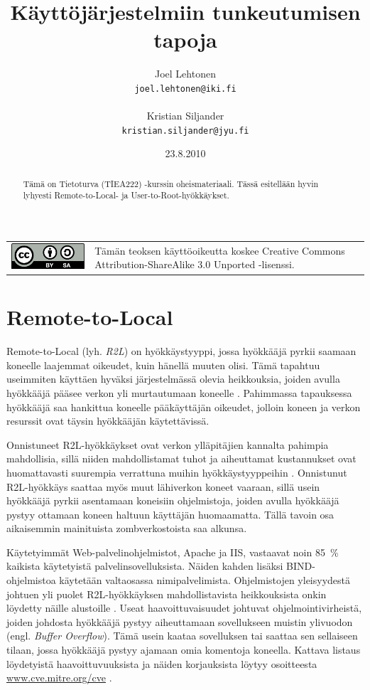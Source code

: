 \documentclass[a4paper,12pt]{article}
\title{Käyttöjärjestelmiin tunkeutumisen tapoja}
\author{Joel Lehtonen\\ \texttt{joel.lehtonen@iki.fi} \\\\Kristian Siljander\\ \texttt{kristian.siljander@jyu.fi}}
\date{23.8.2010}
\newcommand{\license}{
\bigskip%
\noindent\begin{tabular}{ l p{10cm} } %
  \hline%
  \noalign{\bigskip} %
  \includegraphics[height=1.0truecm]{cc-by-sa} %
  & \vspace{-0.95truecm}\small Tämän teoksen käyttöoikeutta koskee Creative Commons
  Attribution-ShareAlike 3.0 Unported -lisenssi.\normalsize \\ %
\end{tabular}%
}
\begin{document}
\maketitle

\begin{abstract}
\noindent Tämä on Tietoturva (TIEA222) -kurssin oheismateriaali. Tässä esitellään hyvin lyhyesti Remote-to-Local- ja User-to-Root-hyökkäykset.
\end{abstract}

\license
\pagebreak


\section{Remote-to-Local}

Remote-to-Local (lyh. \textit{R2L}) on hyökkäystyyppi, jossa hyökkääjä pyrkii
saamaan koneelle laajemmat oikeudet, kuin hänellä muuten
olisi. Tämä tapahtuu useimmiten käyttäen hyväksi järjestelmässä olevia
heikkouksia, joiden avulla hyökkääjä pääsee verkon yli murtautumaan
koneelle \cite{IDS}. Pahimmassa tapauksessa hyökkääjä saa hankittua koneelle
pääkäyttäjän oikeudet, jolloin koneen ja verkon resurssit ovat täysin
hyökkääjän käytettävissä.

Onnistuneet R2L-hyökkäykset ovat verkon ylläpitäjien kannalta pahimpia
mahdollisia, sillä niiden mahdollistamat tuhot ja aiheuttamat kustannukset ovat
huomattavasti suurempia verrattuna muihin hyökkäystyyppeihin \cite{IDSb}. Onnistunut R2L-hyökkäys saattaa
myös muut lähiverkon koneet vaaraan, sillä usein hyökkääjä pyrkii asentamaan
koneisiin ohjelmistoja, joiden avulla hyökkääjä pystyy ottamaan koneen haltuun
käyttäjän huomaamatta. Tällä tavoin osa aikaisemmin mainituista
zombverkostoista saa alkunsa.

Käytetyimmät Web-palvelinohjelmistot, Apache ja IIS, vastaavat noin 85~\%
kaikista käytetyistä palvelinsovelluksista. Näiden kahden lisäksi
BIND-\-ohjelmistoa käytetään valtaosassa nimipalvelimista. Ohjelmistojen yleisyydestä
johtuen yli puolet R2L-hyökkäyksen mahdollistavista heikkouksista onkin
löydetty näille alustoille \cite{IDS}. Useat haavoittuvaisuudet johtuvat
ohjelmointivirheistä, joiden johdosta hyökkääjä pystyy aiheuttamaan
sovellukseen muistin ylivuodon (engl. \textit{Buffer Overflow}). Tämä usein kaataa
sovelluksen tai saattaa sen sellaiseen tilaan, jossa hyökkääjä pystyy ajamaan
omia komentoja koneella. Kattava listaus löydetyistä haavoittuvuuksista ja näiden
korjauksista löytyy osoitteesta \url{www.cve.mitre.org/cve} \cite{CVE}.
\end{document}
